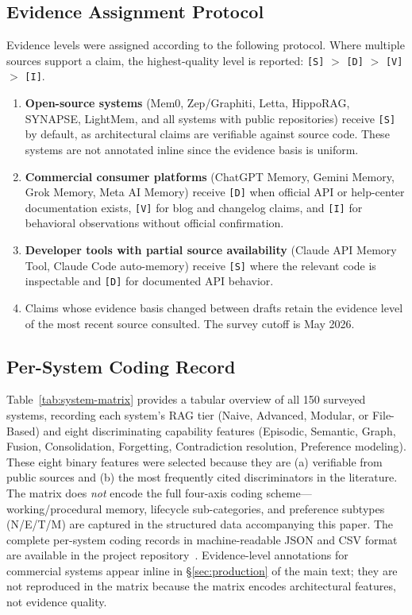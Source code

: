 \subsection{Evidence Assignment Protocol}
\label{sec:appendix-protocol}

Evidence levels were assigned according to the following protocol.
Where multiple sources support a claim, the highest-quality level is
reported: \texttt{[S]} $>$ \texttt{[D]} $>$ \texttt{[V]} $>$ \texttt{[I]}.

\begin{enumerate}[leftmargin=*, nosep]
  \item \textbf{Open-source systems} (Mem0, Zep/Graphiti, Letta,
    HippoRAG, SYNAPSE, LightMem, and all systems with public
    repositories) receive \texttt{[S]} by default, as architectural
    claims are verifiable against source code.  These systems are not
    annotated inline since the evidence basis is uniform.

  \item \textbf{Commercial consumer platforms} (ChatGPT Memory, Gemini
    Memory, Grok Memory, Meta AI Memory) receive \texttt{[D]} when
    official API or help-center documentation exists, \texttt{[V]} for
    blog and changelog claims, and \texttt{[I]} for behavioral
    observations without official confirmation.

  \item \textbf{Developer tools with partial source availability}
    (Claude API Memory Tool, Claude Code auto-memory) receive
    \texttt{[S]} where the relevant code is inspectable and \texttt{[D]}
    for documented API behavior.

  \item Claims whose evidence basis changed between drafts retain the
    evidence level of the most recent source consulted.  The survey
    cutoff is May 2026.
\end{enumerate}

\subsection{Per-System Coding Record}
\label{sec:appendix-matrix}

Table~\ref{tab:system-matrix} provides a tabular overview of all 150
surveyed systems, recording each system's RAG tier (Naive, Advanced,
Modular, or File-Based) and eight discriminating capability features
(Episodic, Semantic, Graph, Fusion, Consolidation, Forgetting,
Contradiction resolution, Preference modeling).  These eight binary
features were selected because they are (a) verifiable from public
sources and (b) the most frequently cited discriminators in the
literature.  The matrix does \emph{not} encode the full four-axis coding
scheme---working/procedural memory, lifecycle sub-categories, and
preference subtypes (N/E/T/M) are captured in the structured data
accompanying this paper.  The complete per-system coding records in
machine-readable JSON and CSV format are available in the project
repository~\cite{alaya2026}.  Evidence-level annotations for commercial
systems appear inline in \S\ref{sec:production} of the main text; they
are not reproduced in the matrix because the matrix encodes
architectural features, not evidence quality.


